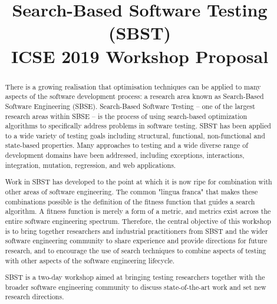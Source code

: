 \documentclass[10pt,conference]{IEEEtran}
\begin{document}
\title{Search-Based Software Testing (SBST) \\ ICSE 2019 Workshop Proposal}



\author{
\and
{}
}

\maketitle

\begin{abstract}
  There is a growing realisation that optimisation techniques can be
  applied to many aspects of the software development process: a
  research area known as Search-Based Software Engineering
  (SBSE). Search-Based Software Testing -- one of the largest research
  areas within SBSE -- is the process of using search-based
  optimization algorithms to specifically address problems in software
  testing. SBST has been applied to a wide variety of testing goals
  including structural, functional, non-functional and state-based
  properties. Many approaches to testing and a wide diverse range of
  development domains have been addressed, including exceptions,
  interactions, integration, mutation, regression, and web
  applications.

  Work in SBST has developed to the point at which it is now ripe for
  combination with other areas of software engineering. The common
  "lingua franca" that makes these combinations possible is the
  definition of the fitness function that guides a search algorithm. A
  fitness function is merely a form of a metric, and metrics exist
  across the entire software engineering spectrum. Therefore, the
  central objective of this workshop is to bring together researchers
  and industrial practitioners from SBST and the wider software
  engineering community to share experience and provide directions for
  future research, and to encourage the use of search techniques to
  combine aspects of testing with other aspects of the software
  engineering lifecycle.

  SBST is a two-day workshop aimed at bringing testing researchers
  together with the broader software engineering community to discuss
  state-of-the-art work and set new research directions.
\end{abstract}
\end{document}
